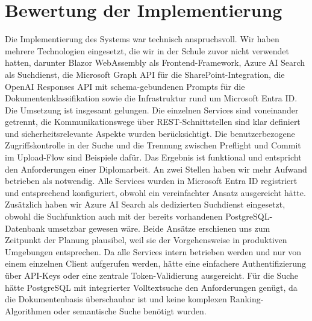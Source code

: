 \section{Bewertung der Implementierung}

Die Implementierung des Systems war technisch anspruchsvoll. Wir haben mehrere Technologien eingesetzt, die wir in der Schule zuvor nicht verwendet hatten, darunter Blazor WebAssembly als Frontend-Framework, Azure AI Search als Suchdienst, die Microsoft Graph API für die SharePoint-Integration, die OpenAI Responses API mit schema-gebundenen Prompts für die Dokumentenklassifikation sowie die Infrastruktur rund um Microsoft Entra ID.
Die Umsetzung ist insgesamt gelungen. Die einzelnen Services sind voneinander getrennt, die Kommunikationswege über REST-Schnittstellen sind klar definiert und sicherheitsrelevante Aspekte wurden berücksichtigt. Die benutzerbezogene Zugriffskontrolle in der Suche und die Trennung zwischen Preflight und Commit im Upload-Flow sind Beispiele dafür. Das Ergebnis ist funktional und entspricht den Anforderungen einer Diplomarbeit.
An zwei Stellen haben wir mehr Aufwand betrieben als notwendig. Alle Services wurden in Microsoft Entra ID registriert und entsprechend konfiguriert, obwohl ein vereinfachter Ansatz ausgereicht hätte. Zusätzlich haben wir Azure AI Search als dedizierten Suchdienst eingesetzt, obwohl die Suchfunktion auch mit der bereits vorhandenen PostgreSQL-Datenbank umsetzbar gewesen wäre. Beide Ansätze erschienen uns zum Zeitpunkt der Planung plausibel, weil sie der Vorgehensweise in produktiven Umgebungen entsprechen. Da alle Services intern betrieben werden und nur von einem einzelnen Client aufgerufen werden, hätte eine einfachere Authentifizierung über API-Keys oder eine zentrale Token-Validierung ausgereicht. Für die Suche hätte PostgreSQL mit integrierter Volltextsuche den Anforderungen genügt, da die Dokumentenbasis überschaubar ist und keine komplexen Ranking-Algorithmen oder semantische Suche benötigt wurden.